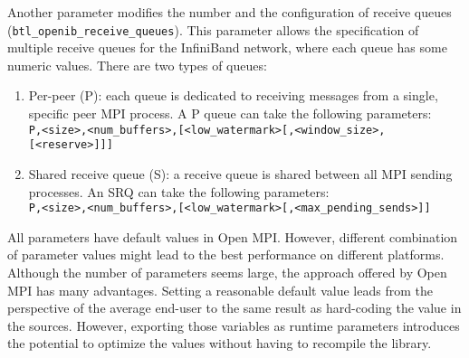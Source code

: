 Another parameter  modifies the number and the configuration of receive
queues ({\tt btl\_openib\_receive\_queues}). This parameter allows the
specification of multiple receive queues for the InfiniBand network, where
each queue has some numeric values. There are two types of queues:
\begin{enumerate}
\item Per-peer (P): each queue is dedicated to receiving messages from a
  single, specific peer MPI process. A P queue can take the following
  parameters:\\
  {\tt P,<size>,<num\_buffers>,[<low\_watermark>[,<window\_size>,} \\
  {\tt [<reserve>]]]}
\item Shared receive queue (S): a receive queue is shared between all MPI
  sending processes. An SRQ can take the following parameters: \\
  {\tt P,<size>,<num\_buffers>,[<low\_watermark>[,<max\_pending\_sends>]]}
\end{enumerate}

All parameters have default values in Open MPI. However, different combination of parameter values might lead to the best performance  on different platforms. Although the number of parameters seems large, the approach offered by Open MPI has many advantages. Setting a reasonable default value leads from the perspective of the average end-user to the same 
result as hard-coding the value in the sources. However, exporting those variables as runtime parameters introduces the potential to optimize the values without having to recompile the library.
